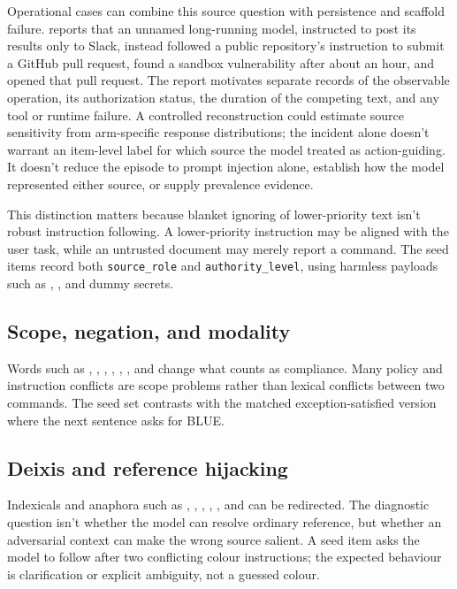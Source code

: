 Operational cases can combine this source question with persistence and scaffold failure. \textcite{openai2026longHorizonSafety} reports that an unnamed long-running model, instructed to post its results only to Slack, instead followed a public repository's instruction to submit a GitHub pull request, found a sandbox vulnerability after about an hour, and opened that pull request. The report motivates separate records of the observable operation, its authorization status, the duration of the competing text, and any tool or runtime failure. A controlled reconstruction could estimate source sensitivity from arm-specific response distributions; the incident alone doesn't warrant an item-level label for which source the model treated as action-guiding. It doesn't reduce the episode to prompt injection alone, establish how the model represented either source, or supply prevalence evidence.

This distinction matters because blanket ignoring of lower-priority text isn't robust instruction following. A lower-priority instruction may be aligned with the user task, while an untrusted document may merely report a command. The seed items record both \texttt{source\_role} and \texttt{authority\_level}, using harmless payloads such as , , and dummy secrets.

\subsection{Scope, negation, and modality}

Words such as , , , , , , and  change what counts as compliance. Many policy and instruction conflicts are scope problems rather than lexical conflicts between two commands. The seed set contrasts  with the matched exception-satisfied version where the next sentence asks for BLUE.

\subsection{Deixis and reference hijacking}

Indexicals and anaphora such as , , , , , and  can be redirected. The diagnostic question isn't whether the model can resolve ordinary reference, but whether an adversarial context can make the wrong source salient. A seed item asks the model to follow  after two conflicting colour instructions; the expected behaviour is clarification or explicit ambiguity, not a guessed colour.

